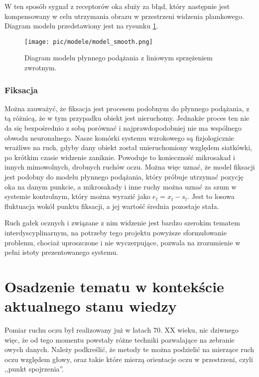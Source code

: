 \documentclass[a4paper,twoside,12pt]{book}
\begin{document}
W ten sposób sygnał z receptorów oka służy za błąd, który następnie jest kompensowany w celu utrzymania obrazu w przestrzeni widzenia plamkowego. Diagram modelu przedstawiony jest na rysunku \ref{fig:model-smooth}.

\begin{figure}[h]
	\centering
	\texttt{[image: pic/modele/model\_smooth.png]}
	\caption{Diagram modelu płynnego podążania z liniowym sprzężeniem zwrotnym.}
	\label{fig:model-smooth}
\end{figure}

\subsubsection{Fiksacja}
\label{subsubsec:fiksacja}

Można zauważyć, że fiksacja jest procesem podobnym do płynnego podążania, z tą różnicą, że w tym przypadku obiekt jest nieruchomy. Jednakże proces ten nie da się bezpośrednio z sobą porównać i najprawdopodobniej nie ma wspólnego obwodu neuronalnego. Nasze komórki systemu wzrokowego są fizjologicznie wrażliwe na ruch, gdyby dany obiekt został unieruchomiony względem siatkówki, po krótkim czasie widzenie zaniknie. Powoduje to konieczność mikrosakad i innych mimowolnych, drobnych ruchów oczu. Można więc uznać, że model fiksacji jest podobny do modelu płynnego podążania, który próbuje utrzymać pozycję oka na danym punkcie, a mikrosakady i inne ruchy można uznać za szum w systemie kontrolnym, który można wyrazić jako $e_t = x_t - s_t$. Jest to losowa fluktuacja wokół punktu fiksacji, a jej wartość średnia pozostaje stała.

Ruch gałek ocznych i związane z nim widzenie jest bardzo szerokim tematem interdyscyplinarnym, na potrzeby tego projektu powyższe sformułowanie problemu, chociaż uproszczone i nie wyczerpujące, pozwala na zrozumienie w pełni istoty prezentowanego systemu.


\section{Osadzenie tematu w kontekście aktualnego stanu wiedzy}
\label{sec:osadzenie-tematu-w-kontekscie-aktualnego-stanu-wiedzy}

Pomiar ruchu oczu był realizowany już w latach 70. XX wieku, nic dziwnego więc, że od tego momentu powstały różne techniki pozwalające na zebranie owych danych. Należy podkreślić, że metody te można podzielić na mierzące ruch oczu względem głowy, oraz takie które mierzą orientacje oczu w przestrzeni, czyli ,,punkt spojrzenia''. 
\end{document}
